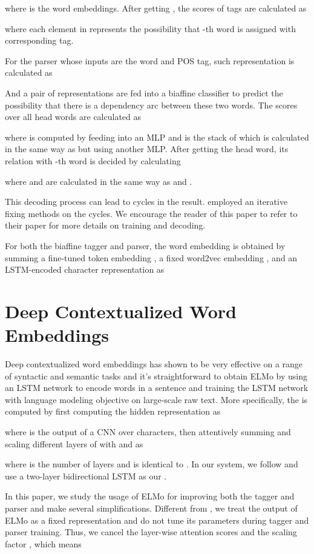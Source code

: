 \documentclass[11pt,a4paper]{article}
\begin{document}
where  is the word embeddings.
After getting ,
the scores of tags are calculated as

where each element in  represents the possibility
that -th word is assigned with corresponding tag.

For the parser whose inputs are the word and POS tag,
such representation is calculated as

And a pair of representations are fed into a biaffine classifier
to predict the possibility that there is a dependency arc between these two words.
The scores over all head words are calculated as

where  is computed by feeding  into an MLP
and  is the stack of 
which is calculated in the same way as 
but using another MLP.
After getting the head  word,
its relation with -th word is decided by calculating 

where  and 
are calculated in the same way as  and .

This decoding process can lead to cycles in the result.
\citet{dozat-qi-manning:2017:K17-3} employed an iterative fixing methods on the cycles.
We encourage the reader of this paper to refer to their paper for more details on training and decoding.

For both the biaffine tagger and parser, 
the word embedding  is obtained by summing 
a fine-tuned token embedding , a fixed word2vec embedding , and an LSTM-encoded
character representation  as


\section{Deep Contextualized Word Embeddings}\label{sec:elmo}

Deep contextualized word embeddings \citep[ELMo]{N18-1202}
has shown to
be very effective on a range of syntactic and semantic tasks
and it's straightforward to obtain ELMo by
using an LSTM network to encode words in a sentence
and training the LSTM network with language modeling objective
on large-scale raw text.
More specifically, the  is computed
by first computing the hidden representation  as

where  is the output of a CNN over characters,
then attentively summing and scaling different layers of  
with  and 
as

where  is the number of layers and  is identical to .
In our system, we follow \citet{N18-1202} and use a two-layer bidirectional LSTM as our .

In this paper, we study the usage of ELMo for improving both
the tagger and parser and make several simplifications.
Different from \citet{N18-1202}, we treat the output of ELMo as a fixed representation
and do not tune its parameters during tagger and parser training.
Thus, we cancel the layer-wise attention scores  and the scaling factor , 
which means
\end{document}
